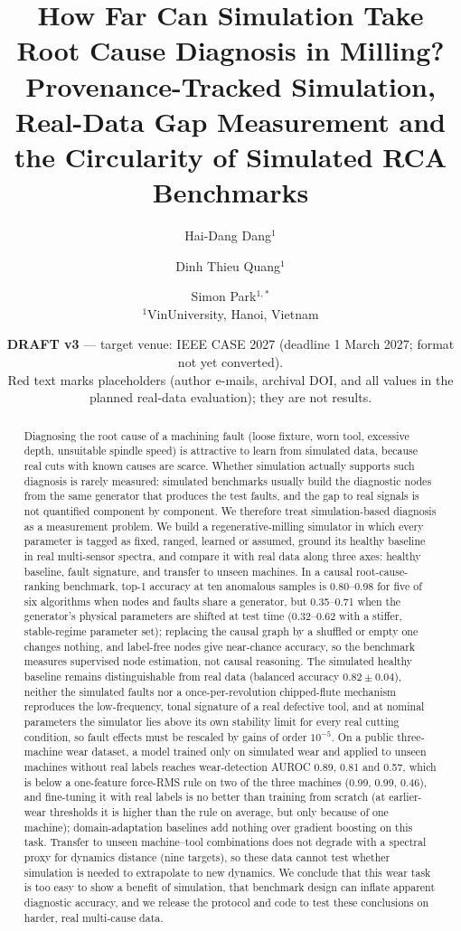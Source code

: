 \documentclass[11pt]{article}
\title{How Far Can Simulation Take Root Cause Diagnosis in Milling?\\
Provenance-Tracked Simulation, Real-Data Gap Measurement and the Circularity of Simulated RCA Benchmarks}
\author{Hai-Dang Dang$^{1}$ \and Dinh Thieu Quang$^{1}$ \and Simon Park$^{1,*}$\\[3pt]
{\normalsize $^{1}$VinUniversity, Hanoi, Vietnam}\\[2pt]
{\normalsize \fake{hai-dang.dang@vinuni.edu.vn \quad dinh.quang@vinuni.edu.vn \quad $^{*}$simon.park@vinuni.edu.vn}}}   %
\date{\textbf{DRAFT v3} --- target venue: IEEE CASE 2027 (deadline 1 March 2027; format not yet converted).\\
{\color{red}Red text marks placeholders (author e-mails, archival DOI, and all values in the planned real-data evaluation); they are not results.}}
\begin{document}
\maketitle

\begin{abstract}
Diagnosing the root cause of a machining fault (loose fixture, worn tool, excessive depth, unsuitable spindle speed) is attractive to learn from simulated data, because real cuts with known causes are scarce.
Whether simulation actually supports such diagnosis is rarely measured: simulated benchmarks usually build the diagnostic nodes from the same generator that produces the test faults, and the gap to real signals is not quantified component by component.
We therefore treat simulation-based diagnosis as a measurement problem.
We build a regenerative-milling simulator in which every parameter is tagged as fixed, ranged, learned or assumed, ground its healthy baseline in real multi-sensor spectra, and compare it with real data along three axes: healthy baseline, fault signature, and transfer to unseen machines.
In a causal root-cause-ranking benchmark, top-1 accuracy at ten anomalous samples is 0.80--0.98 for five of six algorithms when nodes and faults share a generator, but 0.35--0.71 when the generator's physical parameters are shifted at test time (0.32--0.62 with a stiffer, stable-regime parameter set); replacing the causal graph by a shuffled or empty one changes nothing, and label-free nodes give near-chance accuracy, so the benchmark measures supervised node estimation, not causal reasoning.
The simulated healthy baseline remains distinguishable from real data (balanced accuracy $0.82\pm0.04$), neither the simulated faults nor a once-per-revolution chipped-flute mechanism reproduces the low-frequency, tonal signature of a real defective tool, and at nominal parameters the simulator lies above its own stability limit for every real cutting condition, so fault effects must be rescaled by gains of order $10^{-5}$.
On a public three-machine wear dataset, a model trained only on simulated wear and applied to unseen machines without real labels reaches wear-detection AUROC 0.89, 0.81 and 0.57, which is below a one-feature force-RMS rule on two of the three machines (0.99, 0.99, 0.46), and fine-tuning it with real labels is no better than training from scratch (at earlier-wear thresholds it is higher than the rule on average, but only because of one machine); domain-adaptation baselines add nothing over gradient boosting on this task.
Transfer to unseen machine--tool combinations does not degrade with a spectral proxy for dynamics distance (nine targets), so these data cannot test whether simulation is needed to extrapolate to new dynamics.
We conclude that this wear task is too easy to show a benefit of simulation, that benchmark design can inflate apparent diagnostic accuracy, and we release the protocol and code to test these conclusions on harder, real multi-cause data.
\end{abstract}
\end{document}
